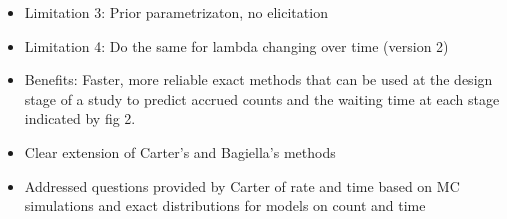 \begin{itemize}
\item Limitation 3: Prior parametrizaton, no elicitation
\item Limitation 4: Do the same for lambda changing over time (version 2)
\item Benefits: Faster, more reliable exact methods that can be used at the design stage of a study to predict accrued counts and the waiting time at each stage indicated by fig 2.
\item Clear extension of Carter's and Bagiella's methods
\item Addressed questions provided by Carter of rate and time based on MC simulations and exact distributions for models on count and time
\end{itemize}
